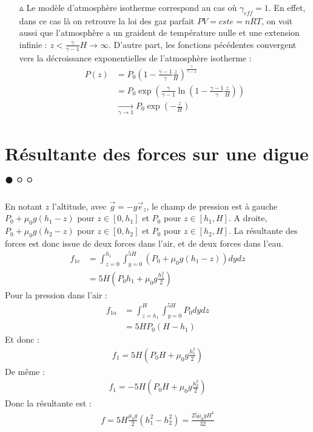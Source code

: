 \documentclass{report}
\begin{document}
\begin{itemize}
	\item[$\vartriangle$] Le modèle d'atmosphère isotherme correspond au cas où $\gamma_{eff}=1$. En effet, dans ce cas là on retrouve la loi des gaz parfait $PV=cste=nRT$, on voit aussi que l'atmosphère a un graident de température nulle et une extension infinie : $z<\frac{\gamma}{\gamma-1}H\longrightarrow\infty$. D'autre part, les fonctions pécédentes convergent vers la décroissance exponentielles de l'atmosphère isotherme :
	\begin{align*}
		P(z)&=P_0\left(1-\frac{\gamma-1}{\gamma}\frac{z}{H} \right)^{\frac{\gamma}{\gamma-1}}\\
		&=P_0\exp\left(\frac{\gamma}{\gamma-1}\ln\left(1-\frac{\gamma-1}{\gamma}\frac{z}{H} \right)\right) \\
		&\xrightarrow[\gamma\to1]{} P_0\exp\left(-\frac{z}{H} \right) 
	\end{align*}

\end{itemize}

\newpage

\section*{Résultante des forces sur une digue $\bullet\circ\circ$}

En notant $z$ l'altitude, avec $\vec{g}=-g\vec{e}_z$, le champ de pression est à gauche $P_0+\mu_0g(h_1-z)$ pour $z\in[0,h_1]$ et $P_0$ pour $z\in[h_1, H]$. A droite, $P_0+\mu_0g(h_2-z)$ pour $z\in[0,h_2]$ et $P_0$ pour $z\in[h_2, H]$. La résultante des forces est donc issue de deux forces dans l'air, et de deux forces dans l'eau.
\begin{align*}
	f_{1e}&=\int_{z=0}^{h_1}\int_{y=0}^{5H}(P_0+\mu_0g(h_1-z))dydz \\
	&=5H\left(P_0h_1+\mu_0g\frac{h_1^2}{2} \right) 
\end{align*}
Pour la pression dans l'air :
\begin{align*}
	f_{1a}&=\int_{z=h_1}^{H}\int_{y=0}^{5H}P_0dydz \\
	&=5HP_0(H-h_1)
\end{align*}
Et donc :
\begin{align*}
	f_1=5H\left(P_0H+\mu_0g\frac{h_1^2}{2} \right) 
\end{align*}
De même : 
\begin{align*}
	f_1=-5H\left(P_0H+\mu_0g\frac{h_2^2}{2} \right) 
\end{align*}
Donc la résultante est :
\begin{align*}
	f=5H\frac{\mu_0 g}{2}(h_1^2-h_2^2)=\frac{25\mu_0gH^3}{32}
\end{align*}

\newpage
\end{document}
